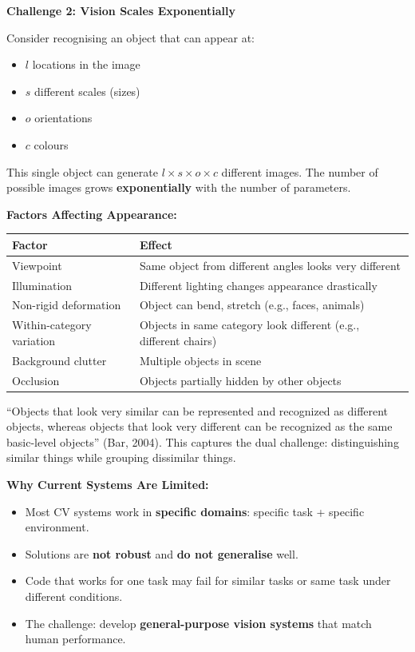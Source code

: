 \separator

\textbf{Challenge 2: Vision Scales Exponentially}

Consider recognising an object that can appear at:
\begin{itemize}
  \item $l$ locations in the image
  \item $s$ different scales (sizes)
  \item $o$ orientations
  \item $c$ colours
\end{itemize}

This single object can generate $l \times s \times o \times c$ different images. The number of possible images grows \textbf{exponentially} with the number of parameters.

\separator

\textbf{Factors Affecting Appearance:}

\begin{center}
\renewcommand{\arraystretch}{1.3}
\begin{tabular}{@{} l p{9cm} @{}}
\toprule
\textbf{Factor} & \textbf{Effect} \\
\midrule
Viewpoint & Same object from different angles looks very different \\
Illumination & Different lighting changes appearance drastically \\
Non-rigid deformation & Object can bend, stretch (e.g., faces, animals) \\
Within-category variation & Objects in same category look different (e.g., different chairs) \\
Background clutter & Multiple objects in scene \\
Occlusion & Objects partially hidden by other objects \\
\bottomrule
\end{tabular}
\end{center}

\begin{tipbox}
``Objects that look very similar can be represented and recognized as different objects, whereas objects that look very different can be recognized as the same basic-level objects'' (Bar, 2004). This captures the dual challenge: distinguishing similar things while grouping dissimilar things.
\end{tipbox}

\separator

\textbf{Why Current Systems Are Limited:}
\begin{itemize}
  \item Most CV systems work in \textbf{specific domains}: specific task + specific environment.
  \item Solutions are \textbf{not robust} and \textbf{do not generalise} well.
  \item Code that works for one task may fail for similar tasks or same task under different conditions.
  \item The challenge: develop \textbf{general-purpose vision systems} that match human performance.
\end{itemize}

